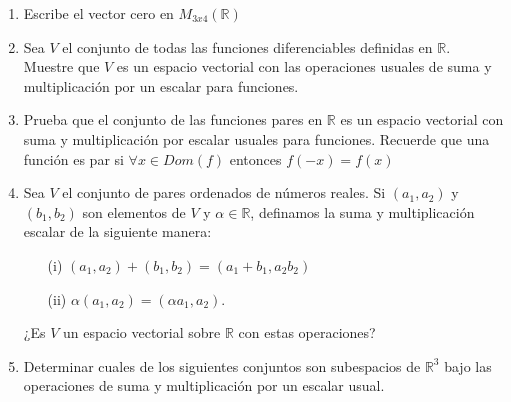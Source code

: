 \documentclass[letterpaper,11pt]{article}
\begin{document}
\begin{enumerate}
 

\item Escribe el vector cero en $M_{3x4}(\mathbb{R})$


 \item Sea $V$ el conjunto de todas las funciones diferenciables definidas en $\mathbb{R}$. Muestre que $V$ es un espacio vectorial con las operaciones usuales de suma y multiplicación por un escalar para funciones. 

 
 \item Prueba que el conjunto de las funciones pares en $\mathbb{R}$ es un espacio vectorial con suma y multiplicación por escalar usuales para funciones. Recuerde que una función es par si $\forall x \in Dom(f)$ entonces $f(-x) = f(x)$ 


\item Sea $V$ el conjunto de pares ordenados de números reales. Si $(a_{1},a_{2})$ y $(b_{1},b_{2})$ son elementos de $V$ y $\alpha \in \mathbb{R}$, definamos la suma y multiplicación escalar de la siguiente manera:
\begin{enumerate}
\item[(i)] $(a_{1},a_{2}) + (b_{1},b_{2}) = (a_{1} + b_{1}, a_{2}b_{2})$ 
\item[(ii)] $\alpha(a_{1},a_{2}) = (\alpha a_{1},a_{2})$.\\
\end{enumerate}
¿Es $V$ un espacio vectorial sobre $\mathbb{R}$ con estas operaciones?


\item Determinar cuales de los siguientes conjuntos son subespacios de $\mathbb{R}^{3}$ bajo las operaciones de suma y multiplicación por un escalar usual.\\


\end{enumerate}
\end{document}
